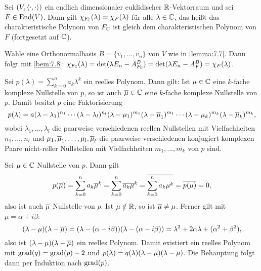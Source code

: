 \begin{lemma}
	\label{lemma:7.9}
	Sei $(V,\left\langle\cdot,\cdot\right\rangle)$ ein endlich dimensionaler euklidischer $\mathbb{R}$-Vektorraum und sei $F \in \operatorname{End}(V)$.
	Dann gilt $\chi_{F_{\mathbb{C}}}(\lambda) = \chi_F(\lambda)$ für alle $\lambda \in \mathbb{C}$, das heißt das charakteristische Polynom von $F_{\mathbb{C}}$ ist gleich dem charakteristischen Polynom von $F$ (fortgesetzt auf $\mathbb{C}$).
\end{lemma}

\begin{beweis}
	Wähle eine Orthonormalbasis $B = \{v_1,\dots,v_n\}$ von $V$ wie in \autoref{lemma:7.7}.
	Dann folgt mit \autoref{bem:7.8}:
	$\chi_{F_{\mathbb{C}}}(\lambda) = \det(\lambda E_n - A^B_{F_{\mathbb{C}}}) = \det(\lambda E_n - A^B_F) = \chi_F(\lambda)$. \qedhere
\end{beweis}

\begin{lemma}
	\label{lemma:7.10}
	Sei $p(\lambda) = \sum_{k=0}^{n} a_k \lambda^k$ ein reelles Polynom.
	Dann gilt:
	Ist $\mu \in \mathbb{C}$ eine $k$-fache komplexe Nullstelle von $p$, so ist auch $\overline{\mu} \in \mathbb{C}$ eine $k$-fache komplexe Nullstelle von $p$.
	Damit besitzt $p$ eine Faktorisierung 
	\[
		p(\lambda) = a(\lambda-\lambda_1)^{n_1} \cdots (\lambda-\lambda_l)^{n_l}(\lambda-\mu_1)^{m_1} (\lambda-\overline{\mu}_1)^{m_1} \cdots (\lambda-\mu_k)^{m_k}(\lambda-\overline{\mu}_k)^{m_k},
	\]
	wobei $\lambda_1,\dots,\lambda_l$ die paarweise verschiedenen reellen Nullstellen mit Vielfachheiten $n_1,\dots,n_l$ und \linebreak $\mu_1,\overline{\mu}_1,\dots,\mu_l,\overline{\mu}_l$ die paarweise verschiedenen konjugiert komplexen Paare nicht-reller Nullstellen mit Vielfachheiten $m_1,\dots,m_k$ von $p$ sind.
\end{lemma}

\begin{beweis}
	Sei $\mu \in \mathbb{C}$ Nullstelle von $p$.
	Dann gilt
	\[
		p(\overline{\mu}) = \sum_{k=0}^{n} a_k \overline{\mu}^k = \sum_{k=0}^{n} \overline{a_k} \overline{\mu}^k = \overline{\sum_{k=0}^{n} a_k \mu^k} = \overline{p(\mu)} = 0,
	\]
	also ist auch $\overline{\mu}$ Nullstelle von $p$.
	Ist $\mu \notin \mathbb{R}$, so ist $\overline{\mu} \neq \mu$.
	Ferner gilt mit $\mu = \alpha + i \beta$:
	\[
		(\lambda-\mu)(\lambda-\overline{\mu}) = (\lambda - (\alpha-i\beta))(\lambda-(\alpha-i\beta)) = \lambda^2 + 2\alpha \lambda + (\alpha^2 + \beta^2),
	\]
	also ist $(\lambda-\mu)(\lambda-\overline{\mu})$ ein reelles Polynom.
	Damit existiert ein reelles Polynom mit $\operatorname{grad}(q) = \operatorname{grad}(p) - 2$ und $p(\lambda) = q(\lambda)(\lambda-\mu)(\lambda-\overline{\mu})$.
	Die Behauptung folgt dann per Induktion nach $\operatorname{grad}(p)$. \qedhere
\end{beweis}


